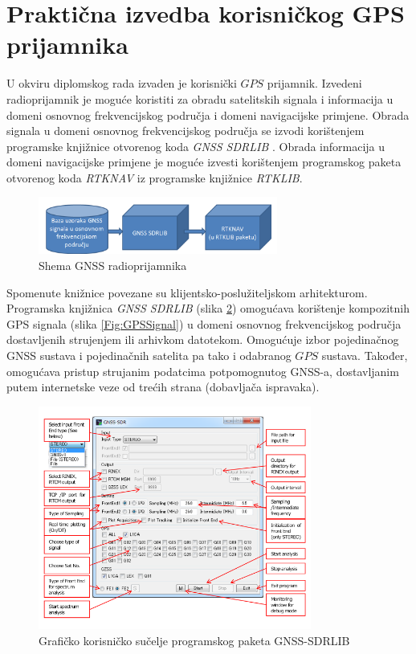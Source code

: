 \documentclass[a4paper,twoside,12pt]{memoir} %
\begin{document}
\section{Praktična izvedba korisničkog GPS prijamnika}
U okviru diplomskog rada izvaden je korisnički $GPS$ prijamnik.
Izvedeni radioprijamnik je moguće koristiti za obradu satelitskih signala i informacija u domeni osnovnog frekvencijskog područja i domeni navigacijske primjene. Obrada signala u domeni osnovnog frekvencijskog područja se izvodi korištenjem programske knjižnice otvorenog koda \textit{GNSS SDRLIB}
\cite{ref:48}. Obrada informacija u domeni navigacijske primjene je moguće izvesti korištenjem programskog paketa otvorenog koda \textit{RTKNAV} iz programske knjižnice \textit{RTKLIB}\cite{ref:36}.

\begin{figure}[H]
	\centering
	\includegraphics[width=0.7\textwidth]{rtkGNSS}
	\caption{Shema GNSS radioprijamnika}
	\label{Fig:radioprijamnik}	
\end{figure}
Spomenute knižnice povezane su klijentsko-poslužiteljskom arhitekturom.
\vspace{0.5cm}
Programska knjižnica \textit{GNSS SDRLIB} (slika \ref{Fig:sdrlib}) omogućava korištenje kompozitnih
GPS signala (slika \ref{Fig:GPSSignal}) u domeni osnovnog  frekvencijskog područja dostavljenih strujenjem
ili arhivkom datotekom.
Omogućuje izbor pojedinačnog GNSS sustava i pojedinačnih satelita pa tako i odabranog $GPS$ sustava.
Također, omogućava pristup strujanim podatcima potpomognutog GNSS-a,  dostavljanim putem internetske veze od trećih strana (dobavljača ispravaka).
\begin{figure}[H]
	\centering
	\includegraphics[width=0.8\textwidth]{sdrlib}
	\caption{Grafičko korisničko sučelje programskog paketa GNSS-SDRLIB}
	\label{Fig:sdrlib}	
\end{figure}
\end{document}
